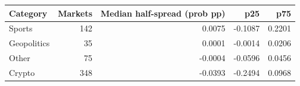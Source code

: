 \begin{tabular}{lrrrr}
\toprule
Category & Markets & Median half-spread (prob pp) & p25 & p75 \\
\midrule
Sports & 142 & 0.0075 & -0.1087 & 0.2201 \\
Geopolitics & 35 & 0.0001 & -0.0014 & 0.0206 \\
Other & 75 & -0.0004 & -0.0596 & 0.0456 \\
Crypto & 348 & -0.0393 & -0.2494 & 0.0968 \\
\bottomrule
\end{tabular}
